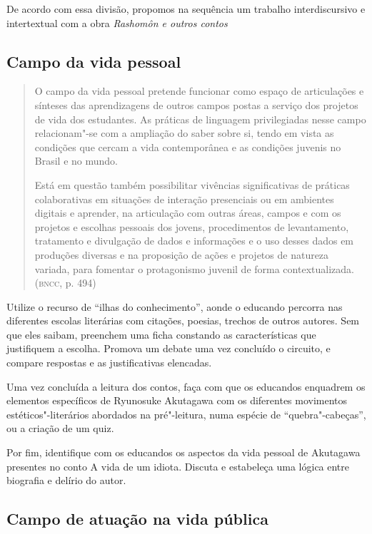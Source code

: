 \documentclass[12pt]{extarticle}
\begin{document}
De acordo com essa divisão, propomos na sequência um trabalho
interdiscursivo e intertextual com a obra \emph{Rashomôn e outros
contos}

\subsection{Campo da vida pessoal}

\begin{quote}
O campo da vida pessoal pretende funcionar como espaço de articulações
e sínteses das aprendizagens de outros campos postas a serviço dos
projetos de vida dos estudantes. As práticas de linguagem privilegiadas
nesse campo relacionam"-se com a ampliação do saber sobre si, tendo em
vista as condições que cercam a vida contemporânea e as condições
juvenis no Brasil e no mundo.

Está em questão também possibilitar vivências significativas de práticas
colaborativas em situações de interação presenciais ou em ambientes
digitais e aprender, na articulação com outras áreas, campos e com os
projetos e escolhas pessoais dos jovens, procedimentos de levantamento,
tratamento e divulgação de dados e informações e o uso desses dados em
produções diversas e na proposição de ações e projetos de natureza
variada, para fomentar o protagonismo juvenil de forma
contextualizada. (\textsc{bncc}, p. 494)
\end{quote}

Utilize o recurso de ``ilhas do conhecimento'', aonde o educando
percorra nas diferentes escolas literárias com citações, poesias,
trechos de outros autores. Sem que eles saibam, preenchem uma ficha
constando as características que justifiquem a escolha. Promova um
debate uma vez concluído o circuito, e compare respostas e as
justificativas elencadas.

Uma vez concluída a leitura dos contos, faça com que os educandos
enquadrem os elementos específicos de Ryunosuke Akutagawa com os
diferentes movimentos estéticos"-literários abordados na pré"-leitura,
numa espécie de ``quebra"-cabeças'', ou a criação de um quiz.

Por fim, identifique com os educandos os aspectos da vida pessoal de
Akutagawa presentes no conto A vida de um idiota. Discuta e estabeleça
uma lógica entre biografia e delírio do autor.

\subsection{Campo de atuação na vida pública}
\end{document}
